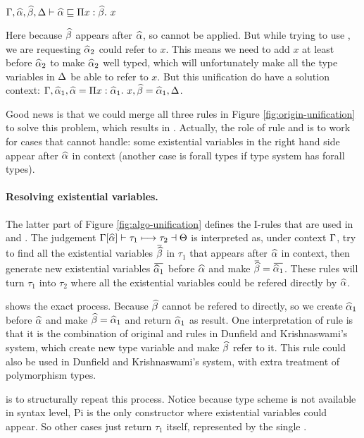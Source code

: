 $\Gamma, \widehat{\alpha}, \widehat{\beta}, \Delta \vdash \widehat{\alpha} \sqsubseteq \Pi x:\widehat{\beta}.~ x$

Here because $\widehat{\beta}$ appears after $\widehat{\alpha}$, so  cannot be applied. But while trying to use , we are requesting $\widehat{\alpha}_2$ could refer to  $x$. This means we need to add $x$ at least before $\widehat{\alpha}_2$ to make $\widehat{\alpha}_2$ well typed, which will unfortunately make all the type variables in $\Delta$ be able to refer to $x$. But this unification do have a solution context: $\Gamma, \widehat{\alpha}_1, \widehat{\alpha} = \Pi x:\widehat{\alpha}_1.~ x, \widehat{\beta} = \widehat{\alpha}_1, \Delta$.

Good news is that we could merge all three rules in Figure \ref{fig:origin-unification} to solve this problem, which results in . Actually, the role of rule  and  is to work for cases that  cannot handle: some existential variables in the right hand side appear after $\widehat{\alpha}$ in context (another case is forall types if type system has forall types).

\paragraph{Resolving existential variables.} The latter part of Figure \ref{fig:algo-unification} defines the I-rules that are used in  and . The judgement $\Gamma[\widehat{\alpha}] \vdash \tau_1 \longmapsto \tau_2 \dashv \Theta$ is interpreted as, under context $\Gamma$, try to find all the existential variables $\overbar \genB$ in $\tau_1$ that appears after $\widehat{\alpha}$ in context, then generate new existential variables $\overbar {\genA_1}$ before $\widehat{\alpha}$ and make $\overbar \genB = \overbar {\genA_1}$. These rules will turn $\tau_1$ into $\tau_2$ where all the existential variables could be refered directly by $\widehat{\alpha}$.

 shows the exact process. Because $\widehat{\beta}$ cannot be refered to directly, so we create $\widehat{\alpha}_1$ before $\widehat{\alpha}$ and make $\widehat{\beta}=\widehat{\alpha}_1$ and return $\widehat{\alpha}_1$ as result. One interpretation of  rule is that it is the combination of original  and  rules in Dunfield and Krishnaswami's system, which create new type variable and make $\widehat{\beta}$ refer to it. This rule could also be used in Dunfield and Krishnaswami's system, with extra treatment of polymorphism types.

 is to structurally repeat this process. Notice because type scheme is not available in syntax level, Pi is the only constructor where existential variables could appear. So other cases just return $\tau_1$ itself, represented by the single .

